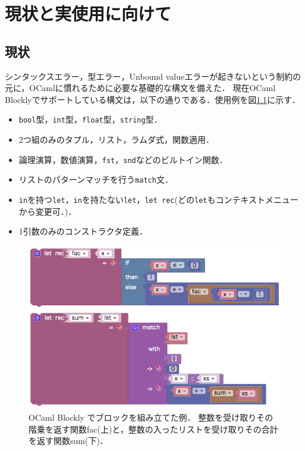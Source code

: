 \chapter {現状と実使用に向けて}\label{chap:todo}

\section {現状}\label{sub:genjo}

シンタックスエラー，型エラー，Unbound valueエラーが起きないという制約の元に，OCamlに慣れるために必要な基礎的な構文を備えた．
現在OCaml Blocklyでサポートしている構文は，以下の通りである．使用例を図\ref{fig:ocamlBlocks}に示す．
\begin{itemize}
  \item {\tt bool}型，{\tt int}型，{\tt float}型，{\tt string}型．
  \item 2つ組のみのタプル，リスト，ラムダ式，関数適用．
  \item 論理演算，数値演算，{\tt fst}，{\tt snd}などのビルトイン関数．
  \item リストのパターンマッチを行う{\tt match}文．
  \item {\tt in}を持つ{\tt let}，{\tt in}を持たない{\tt let}，{\tt let rec}(どの{\tt let}もコンテキストメニューから変更可．)．
  \item 1引数のみのコンストラクタ定義．
\end{itemize}

\begin{figure}[h]
 \centering
 \includegraphics[keepaspectratio, scale=0.4]{img/ocamlBlocks1.png}
 \caption{OCaml Blockly でブロックを組み立てた例．
整数を受け取りその階乗を返す関数fac(上)と，整数の入ったリストを受け取りその合計を返す関数sum(下)．\label{fig:ocamlBlocks}}
\end{figure}


